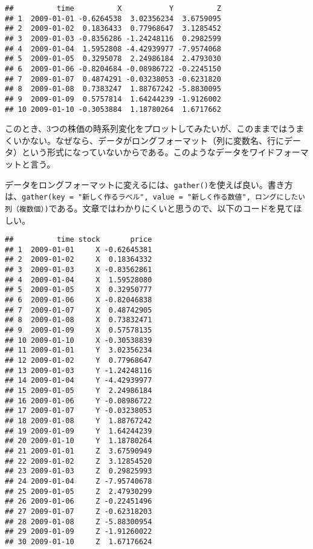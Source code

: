 \documentclass[]{book}
\newenvironment{Shaded}{\begin{snugshade}}{\end{snugshade}}
\newcommand{\KeywordTok}[1]{\textcolor[rgb]{0.13,0.29,0.53}{\textbf{#1}}}
\newcommand{\DataTypeTok}[1]{\textcolor[rgb]{0.13,0.29,0.53}{#1}}
\newcommand{\StringTok}[1]{\textcolor[rgb]{0.31,0.60,0.02}{#1}}
\newcommand{\CommentTok}[1]{\textcolor[rgb]{0.56,0.35,0.01}{\textit{#1}}}
\newcommand{\OperatorTok}[1]{\textcolor[rgb]{0.81,0.36,0.00}{\textbf{#1}}}
\newcommand{\NormalTok}[1]{#1}
\begin{document}
\begin{verbatim}
##          time          X           Y          Z
## 1  2009-01-01 -0.6264538  3.02356234  3.6759095
## 2  2009-01-02  0.1836433  0.77968647  3.1285452
## 3  2009-01-03 -0.8356286 -1.24248116  0.2982599
## 4  2009-01-04  1.5952808 -4.42939977 -7.9574068
## 5  2009-01-05  0.3295078  2.24986184  2.4793030
## 6  2009-01-06 -0.8204684 -0.08986722 -0.2245150
## 7  2009-01-07  0.4874291 -0.03238053 -0.6231820
## 8  2009-01-08  0.7383247  1.88767242 -5.8830095
## 9  2009-01-09  0.5757814  1.64244239 -1.9126002
## 10 2009-01-10 -0.3053884  1.18780264  1.6717662
\end{verbatim}

このとき、3つの株価の時系列変化をプロットしてみたいが、このままではうまくいかない。なぜなら、データがロングフォーマット（列に変数名、行にデータ）という形式になっていないからである。このようなデータをワイドフォーマットと言う。

データをロングフォーマットに変えるには、\texttt{gather()}を使えば良い。書き方は、\texttt{gather(key\ =\ "新しく作るラベル",\ value\ =\ "新しく作る数値",\ ロングにしたい列（複数個）)}である。文章ではわかりにくいと思うので、以下のコードを見てほしい。

\begin{Shaded}
\end{Shaded}

\begin{verbatim}
##          time stock       price
## 1  2009-01-01     X -0.62645381
## 2  2009-01-02     X  0.18364332
## 3  2009-01-03     X -0.83562861
## 4  2009-01-04     X  1.59528080
## 5  2009-01-05     X  0.32950777
## 6  2009-01-06     X -0.82046838
## 7  2009-01-07     X  0.48742905
## 8  2009-01-08     X  0.73832471
## 9  2009-01-09     X  0.57578135
## 10 2009-01-10     X -0.30538839
## 11 2009-01-01     Y  3.02356234
## 12 2009-01-02     Y  0.77968647
## 13 2009-01-03     Y -1.24248116
## 14 2009-01-04     Y -4.42939977
## 15 2009-01-05     Y  2.24986184
## 16 2009-01-06     Y -0.08986722
## 17 2009-01-07     Y -0.03238053
## 18 2009-01-08     Y  1.88767242
## 19 2009-01-09     Y  1.64244239
## 20 2009-01-10     Y  1.18780264
## 21 2009-01-01     Z  3.67590949
## 22 2009-01-02     Z  3.12854520
## 23 2009-01-03     Z  0.29825993
## 24 2009-01-04     Z -7.95740678
## 25 2009-01-05     Z  2.47930299
## 26 2009-01-06     Z -0.22451496
## 27 2009-01-07     Z -0.62318203
## 28 2009-01-08     Z -5.88300954
## 29 2009-01-09     Z -1.91260022
## 30 2009-01-10     Z  1.67176624
\end{verbatim}
\end{document}
